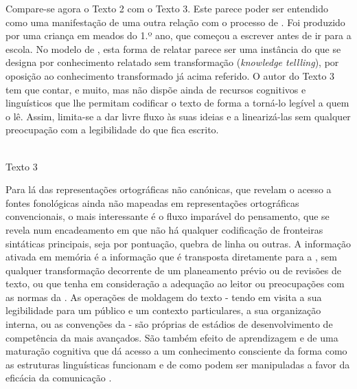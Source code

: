 \documentclass[output=paper]{LSP/langsci}
\begin{document}
\largerpage[2] Compare-se agora o Texto 2 com o Texto 3. Este parece poder ser entendido como uma manifestação de uma outra relação com o processo de . Foi produzido por uma criança em meados do 1.º ano, que começou a escrever antes de ir para a escola. No modelo de \cite{scardamaliabereiter1987}, esta forma de relatar parece ser uma instância do que se designa por conhecimento relatado sem transformação (\textit{knowledge tellling}), por oposição ao conhecimento transformado já acima referido. O autor do Texto 3 tem que contar, e muito, mas não dispõe ainda de recursos cognitivos e linguísticos que lhe permitam codificar o texto de forma a torná-lo legível a quem o lê. Assim, limita-se a dar livre fluxo às suas ideias e a linearizá-las sem qualquer preocupação com a legibilidade do que fica escrito.

\begin{center}
\\\vspace{1em}Texto 3
\end{center}

Para lá das representações ortográficas não canónicas, que revelam o acesso a fontes fonológicas ainda não mapeadas em representações ortográficas convencionais, o mais interessante é o fluxo imparável do pensamento, que se revela num encadeamento em que não há qualquer codificação de fronteiras sintáticas principais, seja por pontuação, quebra de linha ou outras. A informação ativada em memória é a informação que é transposta diretamente para a , sem qualquer transformação decorrente de um planeamento prévio ou de revisões de texto, ou que tenha em consideração a adequação ao leitor ou preocupações com as normas da . As operações de moldagem do texto - tendo em visita a sua legibilidade para um público e um contexto particulares, a sua organização interna, ou as convenções da  - são próprias de estádios de desenvolvimento de competência da  mais avançados. São também efeito de aprendizagem e de uma maturação cognitiva que dá acesso a um conhecimento consciente da forma como as estruturas linguísticas funcionam e de como podem ser manipuladas a favor da eficácia da comunicação . 
\end{document}
